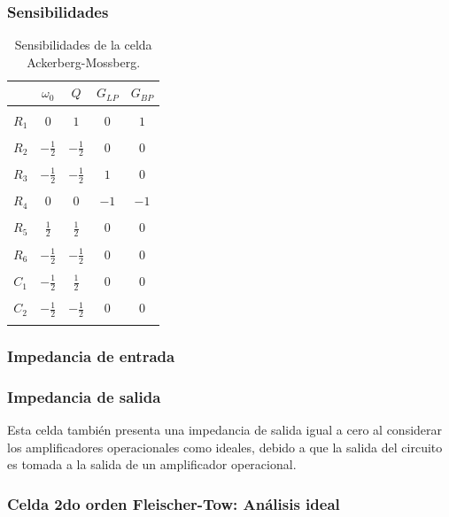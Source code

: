 \subsubsection{Sensibilidades}

\begin{table}[H]
	\centering
	\begin{tabular}{c c c c c }
		& $\omega_0$ & $Q$ &$G_{LP}$ & $G_{BP}$\\
		\hline \\
		$R_1$ & $0$ & $1$ & $0$ & $1$\\ \\
		$R_2$ & $-\frac{1}{2}$ & $-\frac{1}{2}$ & $0$ & $0$\\ \\
		$R_3$ & $-\frac{1}{2}$ & $-\frac{1}{2}$ & $1$ & $0$ \\ \\
		$R_4$ & $0$ & $0$ & $-1$ & $-1$ \\ \\
		$R_5$ & $\frac{1}{2}$ & $\frac{1}{2}$ & $0$ & $0$ \\ \\
		$R_6$ & $-\frac{1}{2}$ & $-\frac{1}{2}$ & $0$ & $0$ \\ \\
		$C_1$ & $-\frac{1}{2} $ & $\frac{1}{2}$ & $0$ & $0$\\ \\
		$C_2$ & $-\frac{1}{2}$ & $-\frac{1}{2}$ & $0$ & $0$\\ \\
		\hline
	\end{tabular}
	\caption{Sensibilidades de la celda Ackerberg-Mossberg.}
	\label{sens_am}
\end{table}

\subsubsection{Impedancia de entrada}

\subsubsection{Impedancia de salida}
Esta celda tambi\'en presenta una impedancia de salida igual a cero al considerar los amplificadores operacionales como ideales, debido a que la salida del circuito es tomada a la salida de un amplificador operacional.

\subsubsection{Celda 2do orden Fleischer-Tow: An\'alisis ideal}


